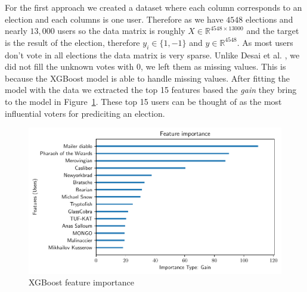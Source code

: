 For the first approach we created a dataset where each column corresponds to an election and each columns is one user. Therefore as we have $4548$ elections and nearly $13,000$ users so the data matrix is roughly $X\in \mathbb{R}^{4548\times 13000}$ and the target is the result of the election, therefore $y_i\in \{1,-1\}$ and $y\in \mathbb{R}^{4548}$. As most users don't vote in all elections the data matrix is very sparse. Unlike Desai et al. \cite{desai2014result}, we did not fill the unknown votes with 0, we left them as missing values. This is because the XGBoost model is able to handle missing values. After fitting the model with the data we extracted the top 15 features based the \textit{gain} they bring to the model in Figure~\ref{fig:xgboost-feat-importance}. These top 15 users can be thought of as the most influential voters for prediciting an election.
\begin{figure}[!ht]
    \centering
    \includegraphics[width=\linewidth]{images/xgboost_features.pdf}
    \caption{XGBoost feature importance}
    \label{fig:xgboost-feat-importance}
\end{figure}
\smallskip

